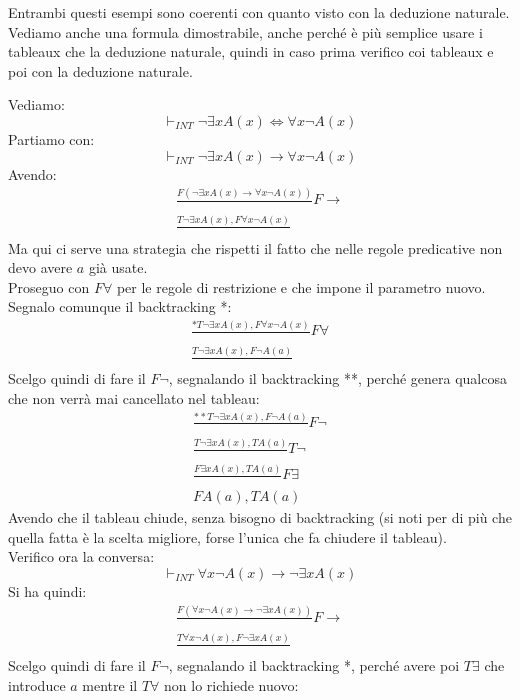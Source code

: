 \documentclass[a4paper,12pt, oneside]{book}
\begin{document}
Entrambi questi esempi sono coerenti con quanto visto con la deduzione
naturale.\\
Vediamo anche una formula dimostrabile, anche perché è più semplice usare i
tableaux che la deduzione naturale, quindi in caso prima verifico coi tableaux e
poi con la deduzione naturale.
\begin{esempio}
  Vediamo:
  \[\vdash_{INT} \neg\exists x A(x)\iff \forall x\neg A(x)\]
  Partiamo con:
  \[\vdash_{INT} \neg\exists x A(x)\to \forall x\neg A(x)\]
  Avendo:
  \begin{gather*}
    \frac{F(\neg\exists x A(x)\to \forall x\neg A(x))}{}F\to\\
    \frac{T\neg\exists xA(x), F\forall x\neg A(x)}{}
  \end{gather*}
  Ma qui ci serve una strategia che rispetti il fatto che nelle regole
  predicative non devo avere $a$ già usate.\\
  Proseguo con $F\forall$ per le regole di restrizione e che impone il parametro
  nuovo. Segnalo comunque il backtracking *:
  \begin{gather*}
    \frac{*T\neg\exists xA(x), F\forall x\neg A(x)}{}F\forall\\
    \frac{T\neg \exists x A(x), F\neg A(a)}{}
  \end{gather*}
  Scelgo quindi di fare il $F\neg$, segnalando il backtracking **, perché genera
  qualcosa che non verrà mai cancellato nel tableau:
  \begin{gather*}
    \frac{**T\neg \exists x A(x), F\neg A(a)}{}F\neg\\
    \frac{T\neg \exists x A(x), T A(a)}{}T\neg\\
    \frac{F\exists xA(x), TA(a)}{}F\exists\\
    FA(a), TA(a)
  \end{gather*}
  Avendo che il tableau chiude, senza bisogno di backtracking (si noti per di
  più che quella fatta è la scelta migliore, forse l'unica che fa chiudere il
  tableau).\\ 
  Verifico ora la conversa:
  \[\vdash_{INT} \forall x\neg A(x)\to \neg\exists x A(x) \]
  Si ha quindi:
  \begin{gather*}
    \frac{F(\forall x\neg A(x)\to \neg\exists x A(x))}{}F\to\\
    \frac{T\forall x\neg A(x), F\neg\exists x A(x)}{}
  \end{gather*}
  Scelgo quindi di fare il $F\neg$, segnalando il backtracking *, perché avere
  poi $T\exists$ che introduce $a$ mentre il $T\forall$ non lo richiede nuovo:

\end{esempio}
\end{document}
